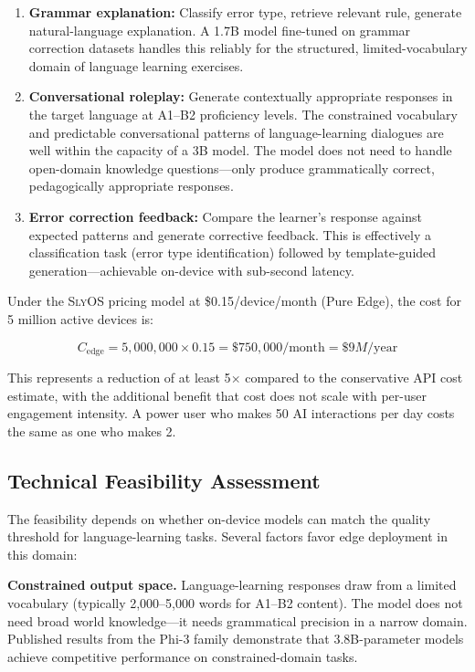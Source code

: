 \documentclass[12pt, letterpaper, twoside]{report}
\newcommand{\slyos}{\textsc{SlyOS}\xspace}
\begin{document}
\begin{enumerate}[itemsep=3pt]
\item \textbf{Grammar explanation:} Classify error type, retrieve relevant rule, generate natural-language explanation. A 1.7B model fine-tuned on grammar correction datasets handles this reliably for the structured, limited-vocabulary domain of language learning exercises.

\item \textbf{Conversational roleplay:} Generate contextually appropriate responses in the target language at A1--B2 proficiency levels. The constrained vocabulary and predictable conversational patterns of language-learning dialogues are well within the capacity of a 3B model. The model does not need to handle open-domain knowledge questions---only produce grammatically correct, pedagogically appropriate responses.

\item \textbf{Error correction feedback:} Compare the learner's response against expected patterns and generate corrective feedback. This is effectively a classification task (error type identification) followed by template-guided generation---achievable on-device with sub-second latency.
\end{enumerate}

Under the \slyos pricing model at \$0.15/device/month (Pure Edge), the cost for 5 million active devices is:

\begin{equation}
C_{\text{edge}} = 5{,}000{,}000 \times 0.15 = \$750{,}000/\text{month} = \$9M/\text{year}
\label{eq:duolingo_edge}
\end{equation}

This represents a reduction of at least 5$\times$ compared to the conservative API cost estimate, with the additional benefit that cost does not scale with per-user engagement intensity. A power user who makes 50 AI interactions per day costs the same as one who makes 2.

\subsection{Technical Feasibility Assessment}

The feasibility depends on whether on-device models can match the quality threshold for language-learning tasks. Several factors favor edge deployment in this domain:

\textbf{Constrained output space.} Language-learning responses draw from a limited vocabulary (typically 2,000--5,000 words for A1--B2 content). The model does not need broad world knowledge---it needs grammatical precision in a narrow domain. Published results from the Phi-3 family demonstrate that 3.8B-parameter models achieve competitive performance on constrained-domain tasks.
\end{document}
